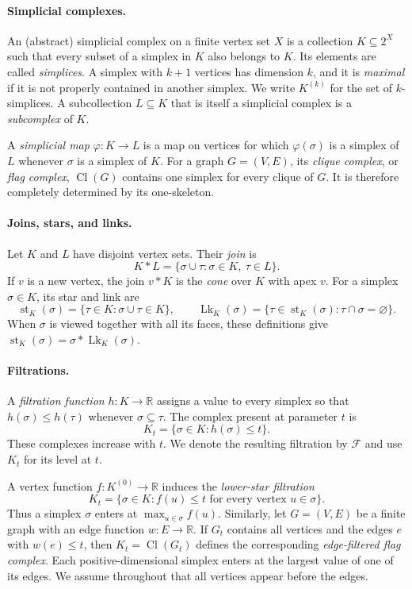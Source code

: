\documentclass[11pt,letterpaper]{article}
\theoremstyle{definition}
\newcommand{\lk}{\operatorname{Lk}}
\newcommand{\cl}{\operatorname{Cl}}
\begin{document}
\paragraph{Simplicial complexes.}
An (abstract) simplicial complex on a finite vertex set $X$ is a collection
$K\subseteq 2^X$ such that every subset of a simplex in $K$ also belongs to
$K$. Its elements are called \emph{simplices}. A simplex with $k+1$ vertices
has dimension $k$, and it is \emph{maximal} if it is not properly contained in
another simplex. We write $K^{(k)}$ for the set of $k$-simplices. A
subcollection $L\subseteq K$ that is itself a simplicial complex is a
\emph{subcomplex} of $K$.

A \emph{simplicial map} $\varphi:K\to L$ is a map on vertices for which
$\varphi(\sigma)$ is a simplex of $L$ whenever $\sigma$ is a simplex of $K$.
For a graph $G=(V,E)$, its \emph{clique complex}, or \emph{flag complex},
$\cl(G)$ contains one simplex for every clique of $G$. It is therefore
completely determined by its one-skeleton.

\paragraph{Joins, stars, and links.}
Let $K$ and $L$ have disjoint vertex sets. Their \emph{join} is
$$
K*L=\{\sigma\cup\tau:\sigma\in K,\ \tau\in L\}.
$$
If $v$ is a new vertex, the join $v*K$ is the \emph{cone} over $K$ with apex
$v$. For a simplex $\sigma\in K$, its star and link are
$$
\operatorname{st}_K(\sigma)
=\{\tau\in K:\sigma\cup\tau\in K\},
\qquad
\lk_K(\sigma)
=\{\tau\in\operatorname{st}_K(\sigma):
  \tau\cap\sigma=\varnothing\}.
$$
When $\sigma$ is viewed together with all its faces, these definitions give
$\operatorname{st}_K(\sigma)=\sigma*\lk_K(\sigma)$.

\paragraph{Filtrations.}
A \emph{filtration function} $h:K\to\mathbb R$ assigns a value to every
simplex so that $h(\sigma)\leq h(\tau)$ whenever $\sigma\subseteq\tau$. The
complex present at parameter $t$ is
$$
K_t=\{\sigma\in K:h(\sigma)\leq t\}.
$$
These complexes increase with $t$. We denote the resulting filtration by
$\mathcal F$ and use $K_t$ for its level at $t$.

A vertex function $f:K^{(0)}\to\mathbb R$ induces the \emph{lower-star
filtration}
$$
K_t=\{\sigma\in K:f(u)\leq t
      \text{ for every vertex }u\in\sigma\}.
$$
Thus a simplex $\sigma$ enters at $\max_{u\in\sigma}f(u)$. Similarly, let
$G=(V,E)$ be a finite graph with an edge function $w:E\to\mathbb R$. If
$G_t$ contains all vertices and the edges $e$ with $w(e)\leq t$, then
$K_t=\cl(G_t)$ defines the corresponding \emph{edge-filtered flag complex}.
Each positive-dimensional simplex enters at the largest value of one of its
edges. We assume throughout that all vertices appear before the edges.
\end{document}
